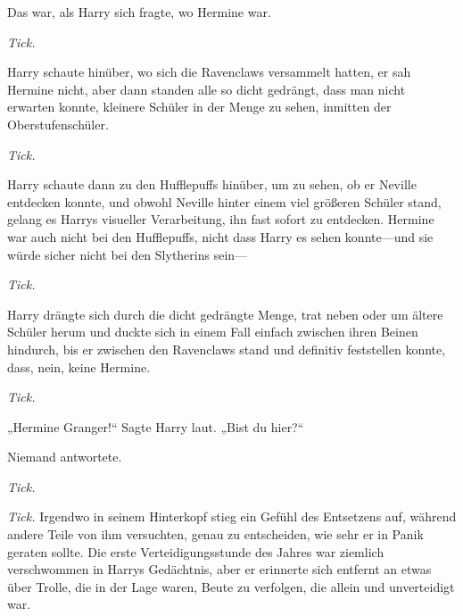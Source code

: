 Das war, als Harry sich fragte, wo Hermine war.

\emph{Tick.}

Harry schaute hinüber, wo sich die Ravenclaws versammelt hatten, er sah Hermine nicht, aber dann standen alle so dicht gedrängt, dass man nicht erwarten konnte, kleinere Schüler in der Menge zu sehen, inmitten der Oberstufenschüler.

\emph{Tick.}

Harry schaute dann zu den Hufflepuffs hinüber, um zu sehen, ob er Neville entdecken konnte, und obwohl Neville hinter einem viel größeren Schüler stand, gelang es Harrys visueller Verarbeitung, ihn fast sofort zu entdecken. Hermine war auch nicht bei den Hufflepuffs, nicht dass Harry es sehen konnte—und sie würde sicher nicht bei den Slytherins sein—

\emph{Tick.}

Harry drängte sich durch die dicht gedrängte Menge, trat neben oder um ältere Schüler herum und duckte sich in einem Fall einfach zwischen ihren Beinen hindurch, bis er zwischen den Ravenclaws stand und definitiv feststellen konnte, dass, nein, keine Hermine.

\emph{Tick.}

„Hermine Granger!“ Sagte Harry laut. „Bist du hier?“

Niemand antwortete.

\emph{Tick.}

\emph{Tick.}
Irgendwo in seinem Hinterkopf stieg ein Gefühl des Entsetzens auf, während andere Teile von ihm versuchten, genau zu entscheiden, wie sehr er in Panik geraten sollte. Die erste Verteidigungsstunde des Jahres war ziemlich verschwommen in Harrys Gedächtnis, aber er erinnerte sich entfernt an etwas über Trolle, die in der Lage waren, Beute zu verfolgen, die allein und unverteidigt war.


